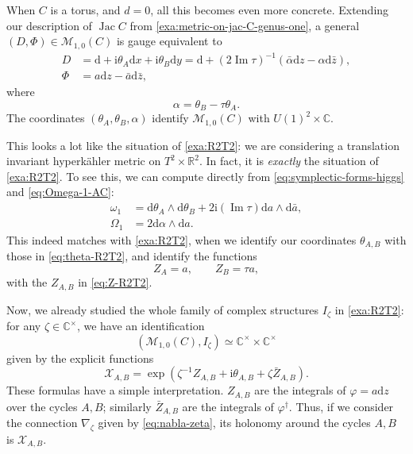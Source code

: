 \documentclass[12pt,letterpaper,reqno]{article}
\numberwithin{equation}{section}
\newcommand{\cM}{\ensuremath{\mathcal M}}
\newcommand{\cX}{\ensuremath{\mathcal X}}
\newcommand{\R}{\ensuremath{\mathbb R}}
\newcommand{\C}{\ensuremath{\mathbb C}}
\newcommand{\hk}{hyperk\"ahler\xspace}
\newcommand{\I}{{\mathrm i}}
\newcommand{\de}{\mathrm{d}}
\newcommand{\ti}[1]{\textit{#1}}
\DeclareMathOperator{\im}{Im}
\DeclareMathOperator{\Jac}{Jac}
\begin{document}
\begin{example}
When $C$ is a torus, and $d = 0$, all this becomes even
more concrete. Extending our description of $\Jac C$
from \autoref{exa:metric-on-jac-C-genus-one}, a general $(D,\Phi) \in \cM_{1,0}(C)$ is gauge equivalent to
\begin{align}
  D &= \de + \I \theta_A \de x + \I \theta_B \de y = \de + (2 \im \tau)^{-1} (\bar\alpha \de z - \alpha \de \bar{z}), \\
  \Phi &= a \de z - \bar{a} \de \bar{z},
\end{align}
where
\begin{equation}
  \alpha = \theta_B - \tau \theta_A.
\end{equation}
The coordinates $(\theta_A, \theta_B, \alpha)$ identify $\cM_{1,0}(C)$
with $U(1)^2 \times \C$.

This looks a lot like the situation of \autoref{exa:R2T2}: we are
considering a translation invariant \hk metric on $T^2 \times \R^2$.
In fact, it is \ti{exactly} the situation of \autoref{exa:R2T2}.
To see this, we can compute directly from \eqref{eq:symplectic-forms-higgs} and
\eqref{eq:Omega-1-AC}:
\begin{align}
  \omega_1 &= \de \theta_A \wedge \de \theta_B + 2 \I (\im \tau) \de a \wedge \de \bar{a}, \label{eq:symplectic-higgs-torus} \\
  \Omega_1 &= 2 \de \alpha \wedge \de a. \label{eq:holsymp-higgs-torus}
\end{align}
This indeed matches with \autoref{exa:R2T2}, when we identify
our coordinates $\theta_{A,B}$ with those in \eqref{eq:theta-R2T2},
and identify the functions
\begin{equation}
  Z_A = a, \qquad Z_B = \tau a,
\end{equation}
with the $Z_{A,B}$ in \eqref{eq:Z-R2T2}.

Now, we already studied the whole family of complex
structures $I_\zeta$ in \autoref{exa:R2T2}: for any
$\zeta \in \C^\times$, we have an identification
\begin{equation}
  (\cM_{1,0}(C), I_\zeta) \simeq \C^\times \times \C^\times
\end{equation}
given by the explicit functions
\begin{equation}
  \cX_{A,B} = \exp \left( \zeta^{-1} Z_{A,B} + \I \theta_{A,B} + \zeta \bar{Z}_{A,B} \right).
\end{equation}
These formulas have a simple interpretation.
$Z_{A,B}$ are the integrals of $\varphi = a \de z$
over the cycles $A,B$; similarly $\bar Z_{A,B}$ are
the integrals of $\varphi^\dagger$.
Thus, if we consider the connection $\nabla_\zeta$ given by
\eqref{eq:nabla-zeta}, its holonomy around the cycles
$A,B$ is $\cX_{A,B}$.

\end{example}
\end{document}
